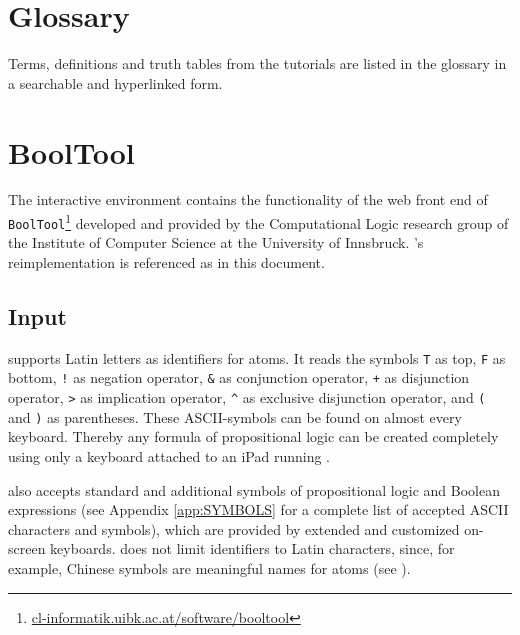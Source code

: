 \section{Glossary}

Terms, definitions and truth tables from the tutorials are listed in the glossary in a searchable and hyperlinked form.

\section{BoolTool}

The interactive environment contains the functionality of the
web front end of \texttt{BoolTool}\footnote{
\href{http://cl-informatik.uibk.ac.at/software/booltool/}{cl-informatik.uibk.ac.at/software/booltool}}
developed and provided by the Computational Logic research group
of the Institute of Computer Science at the University of Innsbruck.
\Nyaya's reimplementation is referenced as \BoolTool in this document.

\subsection{Input}

\BoolTool supports Latin letters as identifiers for atoms. 
It reads the symbols
\verb#T# as top, 
\verb#F# as bottom,
\verb#!# as negation operator, 
\verb#&# as conjunction operator,
\verb#+# as disjunction operator,
\verb#># as implication operator, 
\verb#^# as exclusive disjunction operator,
and \verb#(# and \verb#)# as parentheses.
These ASCII-symbols can be found on almost every keyboard.
Thereby any formula of propositional logic can be created completely
using only a keyboard attached to an iPad running \Nyaya.

\BoolTool also accepts standard 
and additional symbols of propositional logic and Boolean expressions
(see Appendix \vref{app:SYMBOLS} for a complete list of accepted ASCII characters and symbols),
which are provided by extended and customized on-screen keyboards.
\BoolTool does not limit identifiers to Latin characters, since, for example, 
Chinese symbols are meaningful names for atoms (see ).

